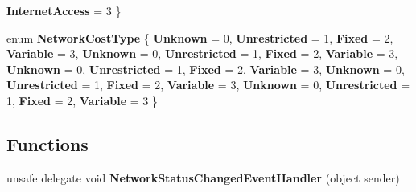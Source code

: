 \begin{DoxyCompactItemize}
{\bfseries Internet\+Access} = 3
 \}
\item 
\mbox{\label{namespace_windows_1_1_networking_1_1_connectivity_a1588bce4ba10673fae3a14c52de8ceb8}} 
enum {\bfseries Network\+Cost\+Type} \{ \newline
{\bfseries Unknown} = 0, 
{\bfseries Unrestricted} = 1, 
{\bfseries Fixed} = 2, 
{\bfseries Variable} = 3, 
\newline
{\bfseries Unknown} = 0, 
{\bfseries Unrestricted} = 1, 
{\bfseries Fixed} = 2, 
{\bfseries Variable} = 3, 
\newline
{\bfseries Unknown} = 0, 
{\bfseries Unrestricted} = 1, 
{\bfseries Fixed} = 2, 
{\bfseries Variable} = 3, 
\newline
{\bfseries Unknown} = 0, 
{\bfseries Unrestricted} = 1, 
{\bfseries Fixed} = 2, 
{\bfseries Variable} = 3, 
\newline
{\bfseries Unknown} = 0, 
{\bfseries Unrestricted} = 1, 
{\bfseries Fixed} = 2, 
{\bfseries Variable} = 3
 \}
\end{DoxyCompactItemize}
\subsection*{Functions}
\begin{DoxyCompactItemize}
\item 
\mbox{\label{namespace_windows_1_1_networking_1_1_connectivity_aa11bca2a28f67a41197659aa2185c941}} 
unsafe delegate void {\bfseries Network\+Status\+Changed\+Event\+Handler} (object sender)
\end{DoxyCompactItemize}
